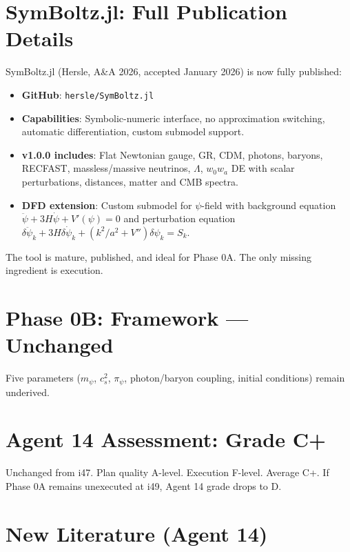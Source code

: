 \documentclass[11pt,a4paper]{article}
\begin{document}
\section{SymBoltz.jl: Full Publication Details}

\begin{tcolorbox}[colback=green!5!white, colframe=green!60!black,
  title={SymBoltz.jl v1.0.0: A\&A Published, Developer-Ready for DFD}]

SymBoltz.jl (Hersle, A\&A 2026, accepted January 2026) is now fully published:
\begin{itemize}
\item \textbf{GitHub}: \texttt{hersle/SymBoltz.jl}
\item \textbf{Capabilities}: Symbolic-numeric interface, no approximation switching, automatic differentiation, custom submodel support.
\item \textbf{v1.0.0 includes}: Flat Newtonian gauge, GR, CDM, photons, baryons, RECFAST, massless/massive neutrinos, $\Lambda$, $w_0 w_a$ DE with scalar perturbations, distances, matter and CMB spectra.
\item \textbf{DFD extension}: Custom submodel for $\psi$-field with background equation $\ddot{\psi} + 3H\dot{\psi} + V'(\psi) = 0$ and perturbation equation $\delta\ddot{\psi}_k + 3H\delta\dot{\psi}_k + (k^2/a^2 + V'')\delta\psi_k = S_k$.
\end{itemize}

The tool is mature, published, and ideal for Phase 0A. The only missing ingredient is execution.
\end{tcolorbox}

\section{Phase 0B: Framework --- Unchanged}

Five parameters ($m_\psi$, $c_s^2$, $\pi_\psi$, photon/baryon coupling, initial conditions) remain underived.

\section{Agent 14 Assessment: Grade C+}

Unchanged from i47. Plan quality A-level. Execution F-level. Average C+. If Phase 0A remains unexecuted at i49, Agent 14 grade drops to D.

\section{New Literature (Agent 14)}
\end{document}
